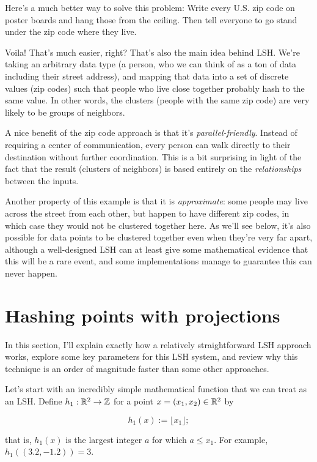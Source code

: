 \documentclass[20pt,]{extarticle}
\begin{document}
Here's a much better way to solve this problem: Write every U.S. zip
code on poster boards and hang those from the ceiling. Then tell
everyone to go stand under the zip code where they live.

Voila! That's much easier, right? That's also the main idea behind LSH.
We're taking an arbitrary data type (a person, who we can think of as a
ton of data including their street address), and mapping that data into
a set of discrete values (zip codes) such that people who live close
together probably hash to the same value. In other words, the clusters
(people with the same zip code) are very likely to be groups of
neighbors.

A nice benefit of the zip code approach is that it's
\emph{parallel-friendly}. Instead of requiring a center of
communication, every person can walk directly to their destination
without further coordination. This is a bit surprising in light of the
fact that the result (clusters of neighbors) is based entirely on the
\emph{relationships} between the inputs.

Another property of this example is that it is \emph{approximate}: some
people may live across the street from each other, but happen to have
different zip codes, in which case they would not be clustered together
here. As we'll see below, it's also possible for data points to be
clustered together even when they're very far apart, although a
well-designed LSH can at least give some mathematical evidence that this
will be a rare event, and some implementations manage to guarantee this
can never happen.

\section{Hashing points with
projections}\label{hashing-points-with-projections}

In this section, I'll explain exactly how a relatively straightforward
LSH approach works, explore some key parameters for this LSH system, and
review why this technique is an order of magnitude faster than some
other approaches.

Let's start with an incredibly simple mathematical function that we can
treat as an LSH. Define \(h_1:\mathbb{R}^2 \to \mathbb{Z}\) for a point
\(x=(x_1, x_2)\in\mathbb{R}^2\) by

\[ h_1(x) := \lfloor x_1 \rfloor; \]

that is, \(h_1(x)\) is the largest integer \(a\) for which \(a\le x_1.\)
For example, \(h_1((3.2, -1.2)) = 3.\)
\end{document}
